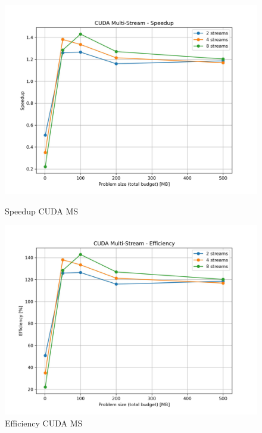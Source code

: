 			\begin{figure}[H]
				\centering
				\begin{minipage}[t]{0.49\textwidth}
					\centering
					\includegraphics[width=\textwidth]{img/cuda_ms_plots/cuda_ms_speedup.jpg}
					\caption{Speedup CUDA MS}
					\label{fig:cuda_ms_speedup}
				\end{minipage}
				\hfill
				\begin{minipage}[t]{0.49\textwidth}
					\centering
					\includegraphics[width=\textwidth]{img/cuda_ms_plots/cuda_ms_efficiency.jpg}
					\caption{Efficiency CUDA MS}
					\label{fig:cuda_ms_efficiency}
				\end{minipage}
			\end{figure}
			
